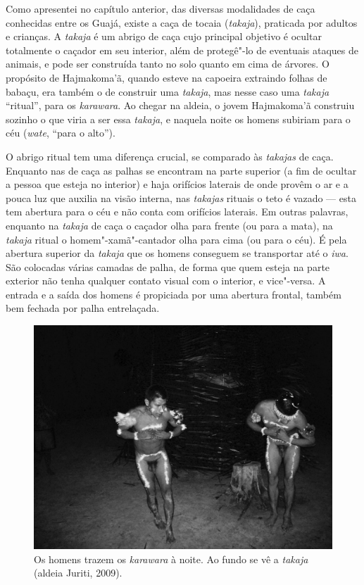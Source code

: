 Como apresentei no capítulo anterior, das diversas modalidades de caça
conhecidas entre os Guajá, existe a caça de tocaia (\emph{takaja}),
praticada por adultos e crianças. A \emph{takaja} é um abrigo de caça
cujo principal objetivo é ocultar totalmente o caçador em seu interior,
além de protegê"-lo de eventuais ataques de animais, e pode ser
construída tanto no solo quanto em cima de árvores. O propósito de
Hajmakoma'ã, quando esteve na capoeira extraindo folhas de babaçu, era
também o de construir uma \emph{takaja}, mas nesse caso uma
\emph{takaja} ``ritual'', para os \emph{karawara}. Ao chegar na aldeia, o
jovem Hajmakoma'ã construiu sozinho o que viria a ser essa
\emph{takaja}, e naquela noite os homens subiriam para o céu
(\emph{wate}, ``para o alto'').

O abrigo ritual tem uma diferença crucial, se comparado às
\emph{takajas} de caça. Enquanto nas de caça as palhas se encontram na
parte superior (a fim de ocultar a pessoa que esteja no interior) e haja
orifícios laterais de onde provêm o ar e a pouca luz que auxilia na
visão interna, nas \emph{takajas} rituais o teto é vazado --- esta tem
abertura para o céu e não conta com orifícios laterais. Em outras
palavras, enquanto na \emph{takaja} de caça o caçador olha para frente
(ou para a mata), na \emph{takaja} ritual o homem"-xamã"-cantador olha
para cima (ou para o céu). É pela abertura superior da \emph{takaja} que
os homens conseguem se transportar até o \emph{iwa}. São colocadas
várias camadas de palha, de forma que quem esteja na parte exterior não
tenha qualquer contato visual com o interior, e vice"-versa. A entrada e
a saída dos homens é propiciada por uma abertura frontal, também bem
fechada por palha entrelaçada.

\begin{figure}[!hb]
\centering
  \includegraphics[width=\textwidth]{./imgs/100_1695}
\caption{Os homens trazem os \emph{karawara} à noite. Ao fundo se vê a \emph{takaja} (aldeia Juriti, 2009).}
\end{figure}


